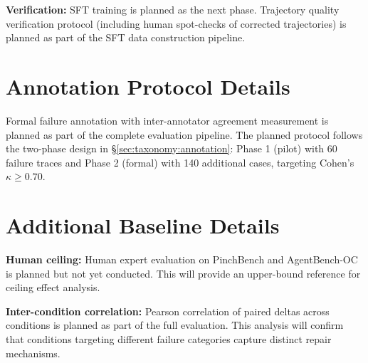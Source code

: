 \textbf{Verification:} SFT training is planned as the next phase. Trajectory quality verification protocol (including human spot-checks of corrected trajectories) is planned as part of the SFT data construction pipeline.

\section{Annotation Protocol Details}
\label{app:annotation}

Formal failure annotation with inter-annotator agreement measurement is planned as part of the complete evaluation pipeline. The planned protocol follows the two-phase design in \S\ref{sec:taxonomy:annotation}: Phase 1 (pilot) with 60 failure traces and Phase 2 (formal) with 140 additional cases, targeting Cohen's $\kappa \ge 0.70$.

\section{Additional Baseline Details}
\label{app:baselines}

\textbf{Human ceiling:} Human expert evaluation on PinchBench and AgentBench-OC is planned but not yet conducted. This will provide an upper-bound reference for ceiling effect analysis.

\textbf{Inter-condition correlation:} Pearson correlation of paired deltas across conditions is planned as part of the full evaluation. This analysis will confirm that conditions targeting different failure categories capture distinct repair mechanisms.
